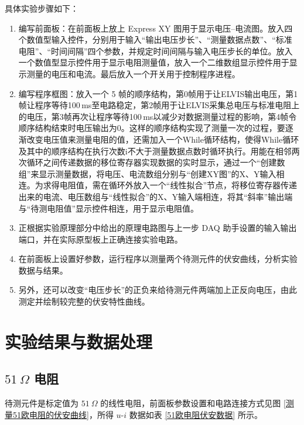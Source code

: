 \documentclass[UTF8]{article}
\theoremstyle{MyLineTheoremStyle} %
\theoremstyle{MyBlockTheoremStyle} %
\theoremstyle{MySubsubsectionStyle} %
\begin{document}
\noindent 具体实验步骤如下：
\begin{enumerate}
\item 编写前面板：在前面板上放上 Express XY 图用于显示电压--电流图。放入四个数值型输入控件，分别用于输入“输出电压步长”、“测量数据点数”、“标准电阻”、“时间间隔”四个参数，并规定时间间隔与输入电压步长的单位。放入一个数值型显示控件用于显示电阻测量值，放入一个二维数组显示控件用于显示测量的电压和电流。最后放入一个开关用于控制程序进程。
\item 编写程序框图：放入一个 5 帧的顺序结构，第0帧用于让ELVIS输出电压，第1帧让程序等待100\,ms至电路稳定，第2帧用于让ELVIS采集总电压与标准电阻上的电压，第3帧再次让程序等待100\,ms以减少对数据测量过程的影响，第4帧令顺序结构结束时电压输出为0。这样的顺序结构实现了测量一次的过程，要逐渐改变电压值来测量电阻的值，还需加入一个While循环结构，使得While循环及其中的顺序结构在执行次数i不大于测量数据点数时循环执行。用能在相邻两次循环之间传递数据的移位寄存器实现数据的实时显示，通过一个“创建数组”来显示测量数据，将电压、电流数组分别与“创建XY图”的X、Y输入相连。为求得电阻值，需在循环外放入一个“线性拟合”节点，将移位寄存器传递出来的电流、电压数组与“线性拟合”的X、Y输入端相连，将其“斜率”输出端与“待测电阻值”显示控件相连，用于显示电阻值。
\item 正根据实验原理部分中给出的原理电路图与上一步 DAQ 助手设置的输入输出端口，并在实际原型板上正确连接实验电路。
\item 在前面板上设置好参数，运行程序以测量两个待测元件的伏安曲线，分析实验数据与结果。
\item 另外，还可以改变“电压步长”的正负来给待测元件两端加上正反向电压，由此测定并绘制较完整的伏安特性曲线。
\end{enumerate}


\newpage
\section{实验结果与数据处理}

\subsection{$51 \ \Omega$ 电阻}
待测元件是标定值为 $51 \ \Omega$ 的线性电阻，前面板参数设置和电路连接方式见图 \ref{测量51欧电阻的伏安曲线}，所得 $u$-$i$ 数据如表 \ref{51欧电阻伏安数据} 所示。
\end{document}
